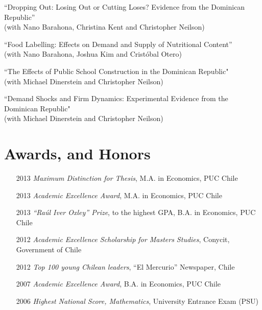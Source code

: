 \documentclass[margin,line]{res}
\begin{document}
\begin{resume}

``Dropping Out: Losing Out or Cutting Loses? Evidence from the Dominican Republic'' \\
(with Nano Barahona, Christina Kent and Christopher Neilson)

``Food Labelling: Effects on Demand and Supply of Nutritional Content'' \\ (with Nano Barahona, Joshua Kim and Crist\'obal Otero)

``The Effects of Public School Construction in the Dominican Republic"\\
(with Michael Dinerstein and Christopher Neilson)

``Demand Shocks and Firm Dynamics: Experimental Evidence from the Dominican Republic"\\
(with Michael Dinerstein and Christopher Neilson)


\section{\sc Awards, and Honors} 
\begin{itemize}[style=multiline,leftmargin=1.2cm,font=\normalfont]
\item[2013] {\em Maximum Distinction for Thesis}, M.A. in Economics, PUC Chile
\item[2013] {\em Academic Excellence Award}, M.A. in Economics, PUC Chile 
\item[2013] {\em ``Ra\'ul Iver Oxley'' Prize}, to the highest GPA, B.A. in Economics, PUC Chile
\item[2012] {\em Academic Excellence Scholarship for Masters Studies}, Conycit, Government of Chile 
\item[2012] {\em Top 100 young Chilean leaders}, ``El Mercurio'' Newspaper, Chile %
\item[2007] {\em Academic Excellence Award}, B.A. in Economics, PUC Chile
\item[2006] {\em Highest National Score, Mathematics}, University Entrance Exam (PSU) 
\end{itemize}


\end{resume}
\end{document}
